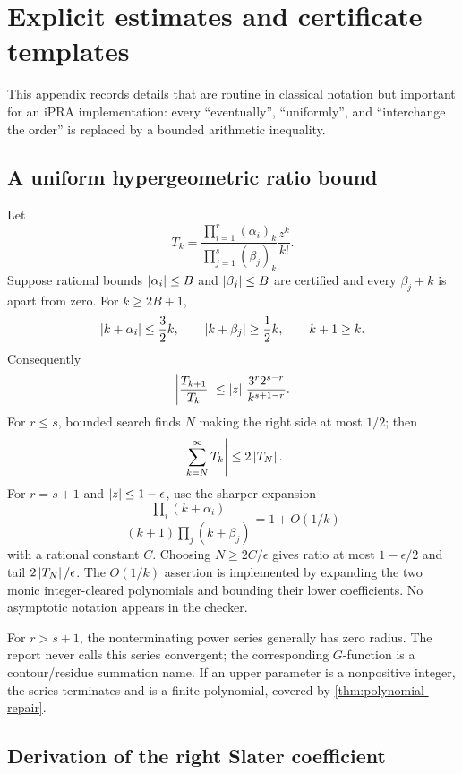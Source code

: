 \appendix
\section{Explicit estimates and certificate templates}\label{sec:appendices}

This appendix records details that are routine in classical notation but
important for an iPRA implementation: every ``eventually'', ``uniformly'', and
``interchange the order'' is replaced by a bounded arithmetic inequality.

\subsection{A uniform hypergeometric ratio bound}

Let
\[
 T_k=\frac{\prod_{i=1}^{r}(\alpha_i)_k}
           {\prod_{j=1}^{s}(\beta_j)_k}\frac{z^k}{k!}.
\]
Suppose rational bounds $\left|\alpha_i\right|\le B$ and
$\left|\beta_j\right|\le B$ are certified and every $\beta_j+k$ is apart from zero.
For $k\ge2B+1$,
\[
 \left|k+\alpha_i\right|\le\frac32k,
 \qquad
 \left|k+\beta_j\right|\ge\frac12k,
 \qquad k+1\ge k.
\]
Consequently
\begin{equation}\label{eq:appendix-ratio}
 \left|\frac{T_{k+1}}{T_k}\right|
 \le \left|z\right|\,\frac{3^r2^{s-r}}{k^{s+1-r}}.
\end{equation}
For $r\le s$, bounded search finds $N$ making the right side at most $1/2$;
then
\begin{equation}\label{eq:appendix-tail-half}
 \left|\sum_{k=N}^{\infty}T_k\right|\le2\left|T_N\right|.
\end{equation}
For $r=s+1$ and $\left|z\right|\le1-\epsilon$, use the sharper expansion
\[
 \frac{\prod_i(k+\alpha_i)}{(k+1)\prod_j(k+\beta_j)}
 =1+O(1/k)
\]
with a rational constant $C$.  Choosing
$N\ge2C/\epsilon$ gives ratio at most $1-\epsilon/2$ and tail
$2\left|T_N\right|/\epsilon$.  The $O(1/k)$ assertion is implemented by expanding the
two monic integer-cleared polynomials and bounding their lower coefficients.
No asymptotic notation appears in the checker.

For $r>s+1$, the nonterminating power series generally has zero radius.  The
report never calls this series convergent; the corresponding $G$-function is a
contour/residue summation name.  If an upper parameter is a nonpositive integer,
the series terminates and is a finite polynomial, covered by
\cref{thm:polynomial-repair}.

\subsection{Derivation of the right Slater coefficient}

